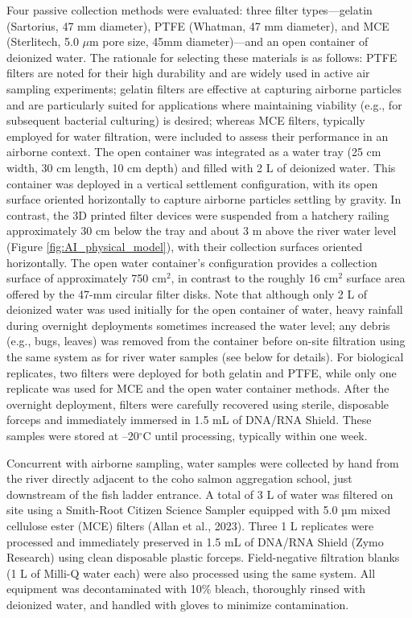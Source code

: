 \documentclass{article}
\begin{document}
Four passive collection methods were evaluated: three filter types—gelatin (Sartorius, 47 mm diameter), PTFE (Whatman, 47 mm diameter), and MCE (Sterlitech, 5.0 $\mu$m pore size, 45mm diameter)—and an open container of deionized water. The rationale for selecting these materials is as follows: PTFE filters are noted for their high durability and are widely used in active air sampling experiments; gelatin filters are effective at capturing airborne particles and are particularly suited for applications where maintaining viability (e.g., for subsequent bacterial culturing) is desired; whereas MCE filters, typically employed for water filtration, were included to assess their performance in an airborne context. The open container was integrated as a water tray (25 cm width, 30 cm length, 10 cm depth) and filled with 2 L of deionized water. This container was deployed in a vertical settlement configuration, with its open surface oriented horizontally to capture airborne particles settling by gravity. In contrast, the 3D printed filter devices were suspended from a hatchery railing approximately 30 cm below the tray and about 3 m above the river water level (Figure \ref{fig:AI_physical_model}), with their collection surfaces oriented horizontally. The open water container’s configuration provides a collection surface of approximately 750 cm$^2$, in contrast to the roughly 16 cm$^2$ surface area offered by the 47-mm circular filter disks. Note that although only 2 L of deionized water was used initially for the open container of water, heavy rainfall during overnight deployments sometimes increased the water level; any debris (e.g., bugs, leaves) was removed from the container before on-site filtration using the same system as for river water samples (see below for details). For biological replicates, two filters were deployed for both gelatin and PTFE, while only one replicate was used for MCE and the open water container methods. After the overnight deployment, filters were carefully recovered using sterile, disposable forceps and immediately immersed in 1.5 mL of DNA/RNA Shield. These samples were stored at –20$^\circ$C until processing, typically within one week.

Concurrent with airborne sampling, water samples were collected by hand from the river directly adjacent to the coho salmon aggregation school, just downstream of the fish ladder entrance. A total of 3 L of water was filtered on site using a Smith-Root Citizen Science Sampler equipped with 5.0 µm mixed cellulose ester (MCE) filters (Allan et al., 2023). Three 1 L replicates were processed and immediately preserved in 1.5 mL of DNA/RNA Shield (Zymo Research) using clean disposable plastic forceps. Field-negative filtration blanks (1 L of Milli-Q water each) were also processed using the same system. All equipment was decontaminated with 10\% bleach, thoroughly rinsed with deionized water, and handled with gloves to minimize contamination.
\end{document}
